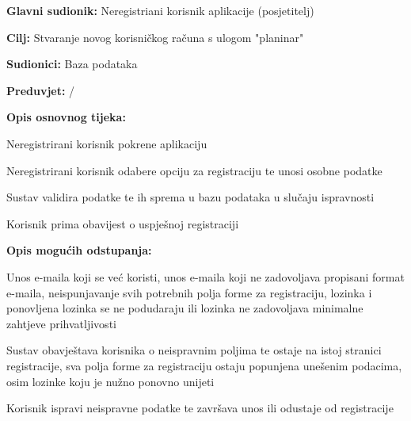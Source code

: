 					

				
				\noindent {}
			\begin{packed_item}
				
				\item \textbf{Glavni sudionik: }$ $Neregistriani korisnik aplikacije (posjetitelj)$ $
				\item  \textbf{Cilj:} $ $Stvaranje novog korisničkog računa s ulogom "planinar"$ $
				\item  \textbf{Sudionici:} $ $Baza podataka$ $
				\item  \textbf{Preduvjet:} $ $/$ $
				\item  \textbf{Opis osnovnog tijeka:}
				
				\item[] \begin{packed_enum}
					
					\item $ $Neregistrirani korisnik pokrene aplikaciju$ $
					\item $ $Neregistrirani korisnik odabere opciju za registraciju te unosi osobne podatke$ $
					\item $ $Sustav validira podatke te ih sprema u bazu podataka u slučaju ispravnosti$ $
					\item $ $Korisnik prima obavijest o uspješnoj registraciji$ $
				\end{packed_enum}
				
				\item  \textbf{Opis mogućih odstupanja:}
				
				\item[] \begin{packed_item}
					
					\item[3.a] $ $Unos e-maila koji se već koristi, unos e-maila koji ne zadovoljava propisani format e-maila, neispunjavanje svih potrebnih polja forme za registraciju, lozinka i ponovljena lozinka se ne podudaraju ili lozinka ne zadovoljava minimalne zahtjeve prihvatljivosti$ $
					
					\item[] \begin{packed_enum}
						
						\item $ $Sustav obavještava korisnika o neispravnim poljima te ostaje na istoj stranici registracije, sva polja forme za registraciju ostaju popunjena unešenim podacima, osim lozinke koju je nužno ponovno unijeti$ $
						\item $ $Korisnik ispravi neispravne podatke te završava unos ili odustaje od registracije$ $
						
					\end{packed_enum}
				\end{packed_item}
			\end{packed_item}
		
